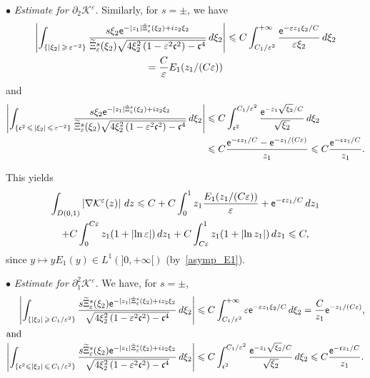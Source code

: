 \documentclass[AHL,Unicode,longabstracts,published]{cedram}
\newcommand*\p{\partial}
\newcommand*\BK{\mathcal{K}}
\newcommand*\ex{{\sf e}}
\newcommand*\cs{{\mathfrak c}}
\newcommand*\ii{\infty}
\newcommand*\gs{\geqslant }
\newcommand*\ls{\leqslant }
\newcommand*\e{\varepsilon}
\renewcommand*\t{\tilde}
\let\oldtilde\tilde
\renewcommand*{\tilde}[1]{\mathchoice{\widetilde{#1}}{\widetilde{#1}}{\oldtilde{#1}}{\oldtilde{#1}}}
\begin{document}
$ \bullet $ \emph{Estimate for $ \p_2 \BK^\e $.} Similarly, for $ s = \pm $, we have
\begin{multline*}
\left\lvert \int_{\left\{ |\xi_2 |\, \gs\,\e^{-2} \right\} } \frac{ s \xi_2 \ex^{- |z_1| \t\Xi_\e^s (\xi_2) + i z_2 \xi_2} }{
\t\Xi_\e^s (\xi_2) \sqrt{ 4 \xi_2^2 \left(1 - \e^2 \cs^2\right) - \cs^4 } } \, d\xi_2 \right\rvert \ls C \int_{C_1 / \e^{2}}^{+\ii } \frac{ \ex^{- \e z_1 \xi_2 / C } }{ \e \xi_2} \, d\xi_2 \\
= \frac{C}{\e} E_1 (z_1/(C \e))
\end{multline*}
and
\begin{align*}
\left\lvert \int_{\left\{ \cs^2\,\ls\,|\xi_2 |\,\ls\,\e^{-2}\right\} } \frac{ s \xi_2 \ex^{- |z_1| \t\Xi_\e^s (\xi_2) + i z_2 \xi_2} }{
\t\Xi_\e^s (\xi_2) \sqrt{ 4 \xi_2^2 \left(1 - \e^2 \cs^2\right) - \cs^4 } } \, d\xi_2 \right\rvert & \ls C \int_{\cs^2}^{C_1 / \e^{2}} \frac{ \ex^{- z_1 \sqrt{ \xi_2} / C } }{\sqrt{ \xi_2} } \, d\xi_2
\\ & \ls C \frac{ \ex^{ - \cs z_1/ C } - \ex^{- z_1/(C \e) } }{z_1}
\ls C \frac{ \ex^{ - \cs z_1/ C } }{z_1}.
\end{align*}

This yields
\begin{multline*}
\int_{D(0,1)} \left\lvert \nabla \BK^\e (z) \right\rvert \, dz  \ls C + C \int_0^1 z_1 \frac{ E_1(z_1/ (C \e)) }{ \e} + \ex^{ - \cs z_1/C } \, d z_1
\\ + C \int_0^{C \e} z_1 (1 + \lvert \ln \e \rvert) \, d z_1 + C \int_{C\e}^1 z_1 (1 + \lvert \ln z_1 \rvert) \, d z_1
\ls C,
\end{multline*}
since $ y \mapsto y E_1 (y) \in L^1 (]0,+\ii[) $ (by~\eqref{asymp_E1}).

\vspace*{4pt}

\noindent $ \bullet $ \emph{Estimate for $ \p_1^2 \BK^\e $.} We have, for $ s = \pm $,
\begin{align*}
\left\lvert \int_{\left\{ |\xi_2 |\, \gs\,C_1 / \e^{2} \right\} } \frac{ s \t\Xi_\e^s (\xi_2) \ex^{- |z_1| \t\Xi_\e^s (\xi_2) + i z_2 \xi_2} }{
\sqrt{ 4 \xi_2^2 \left(1 - \e^2 \cs^2\right) - \cs^4 } } \, d\xi_2 \right\rvert & \ls C \int_{C_1 / \e^{2}}^{+\ii } \e \ex^{- \e z_1 \xi_2/ C } \, d\xi_2 = \frac{C}{z_1} \ex^{ - z_1/(C \e)},
\\
\intertext{and}
\left\lvert \int_{\left\{ \cs^2 \ls |\xi_2 |\,\ls\,C_1 / \e^{2}\right\} } \frac{ s \t\Xi_\e^s (\xi_2) \ex^{- |z_1| \t\Xi_\e^s (\xi_2) + i z_2 \xi_2} }{
\sqrt{ 4 \xi_2^2 \left(1 - \e^2 \cs^2\right) - \cs^4 } } \, d\xi_2 \right\rvert & \ls C \int_{\cs^2}^{C_1 / \e^{2}} \frac{ \ex^{- z_1 \sqrt{ \xi_2} /C } }{ \sqrt{\xi_2} } \, d\xi_2
\ls C \frac{ \ex^{ - \cs z_1/C } }{z_1}.
\end{align*}
\end{document}
